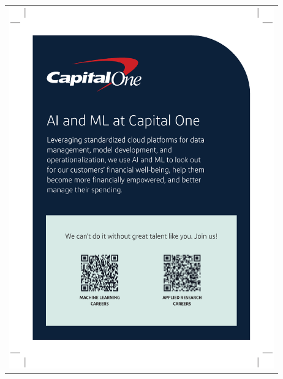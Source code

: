 \thispagestyle{empty}
\begin{center}\begin{tabular}{c}
  \includegraphics[width=4.5in]{content/ads/capone} \\
\end{tabular}\end{center}
